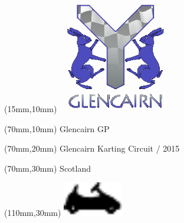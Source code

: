 \null\newpage
\begin{textblock*}{50mm}(15mm,10mm)%
\includegraphics[width=50mm]{LG/GLE.png}
\end{textblock*}
\begin{textblock*}{130mm}(70mm,10mm)%
{\fontsize{20}{20}\selectfont Glencairn GP}\\
\end{textblock*}
\begin{textblock*}{120mm}(70mm,20mm)%
{\fontsize{16}{16}\selectfont Glencairn Karting Circuit / 2015}\\
\end{textblock*}
\begin{textblock*}{120mm}(70mm,30mm)%
{\fontsize{12}{12}\selectfont Scotland}
\end{textblock*}
\begin{textblock*}{30mm}(110mm,30mm)%
\centering
\includegraphics[height=15mm]{icons/kart.pdf}
\end{textblock*}

